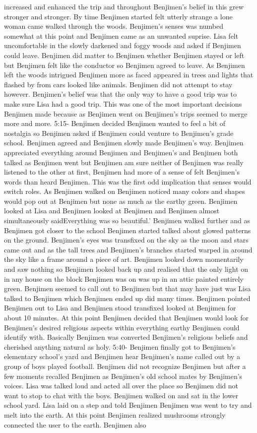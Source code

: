 \documentclass[12pt]{book}
\begin{document}
increased and enhanced the trip and throughout Benjimen's belief in this grew stronger and stronger. By time Benjimen started felt utterly strange a lone woman came walked through the woods. Benjimen's senses was numbed somewhat at this point and Benjimen came as an unwanted suprise. Lisa felt uncomfortable in the slowly darkened and foggy woods and asked if Benjimen could leave. Benjimen did matter to Benjimen whether Benjimen stayed or left but Benjimen felt like the conductor so Benjimen agreed to leave. As Benjimen left the woods intrigued Benjimen more as faced appeared in trees and lights that flashed by from cars looked like animals. Benjimen did not attempt to stay however. Benjimen's belief was that the only way to have a good trip was to make sure Lisa had a good trip. This was one of the most important decisions Benjimen made because as Benjimen went on Benjimen's trips seemed to merge more and more. 5:15- Benjimen decided Benjimen wanted to feel a bit of nostalgia so Benjimen asked if Benjimen could venture to Benjimen's grade school. Benjimen agreed and Benjimen slowly made Benjimen's way. Benjimen appreciated everything around Benjimen and Benjimen's and Benjimen both talked as Benjimen went but Benjimen am sure neither of Benjimen was really listened to the other at first, Benjimen had more of a sense of felt Benjimen's words than heard Benjimen. This was the first odd implication that senses would switch roles. As Benjimen walked on Benjimen noticed many colors and shapes would pop out at Benjimen but none as much as the earthy green. Benjimen looked at Lisa and Benjimen looked at Benjimen and Benjimen almost simultaneously saidEverything was so beautiful.' Benjimen walked further and as Benjimen got closer to the school Benjimen started talked about glowed patterns on the ground. Benjimen's eyes was transfixed on the sky as the moon and stars came out and as the tall trees and Benjimen's branches started warped in around the sky like a frame around a piece of art. Benjimen looked down momentarily and saw nothing so Benjimen looked back up and realised that the only light on in any house on the block Benjimen was on was up in an attic painted entirely green. Benjimen seemed to call out to Benjimen but that may have just was Lisa talked to Benjimen which Benjimen ended up did many times. Benjimen pointed Benjimen out to Lisa and Benjimen stood transfixed looked at Benjimen for about 10 minutes. At this point Benjimen decided that Benjimen would look for Benjimen's desired religious aspects within everything earthy Benjimen could identify with. Basically Benjimen was converted Benjimen's religious beliefs and cherished anything natural as holy. 5:40- Benjimen finally got to Benjimen's elementary school's yard and Benjimen hear Benjimen's name called out by a group of boys played football. Benjimen did not recognize Benjimen but after a few moments recalled Benjimen as Benjimen's old school mates by Benjimen's voices. Lisa was talked loud and acted all over the place so Benjimen did not want to stop to chat with the boys. Benjimen walked on and sat in the lower school yard. Lisa laid on a step and told Benjimen Benjimen was went to try and melt into the earth. At this point Benjimen realized mushrooms strongly connected the user to the earth. Benjimen also 
\end{document}
